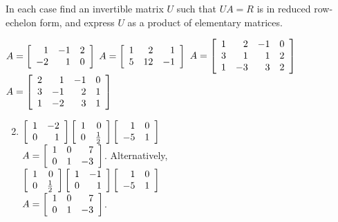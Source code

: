 \begin{multicols}{2}
\begin{ex}
In each case find an invertible matrix $U$ such that $UA = R$ is in reduced row-echelon form, and express $U$ as a product of elementary matrices.
\begin{exenumerate}
\exitem $A = \left[ \begin{array}{rrr}
1 & -1 & 2 \\
-2 & 1 & 0
\end{array} \right]$
\exitem $A = \left[ \begin{array}{rrr}
1 & 2 & 1 \\
5 & 12 & -1
\end{array} \right]$
\exitem* $A = \left[ \begin{array}{rrrr}
1 & 2 & -1 & 0 \\
3 & 1 & 1 & 2 \\
1 & -3 & 3 & 2
\end{array} \right]$
\exitem* $A = \left[ \begin{array}{rrrr}
2 & 1 & -1 & 0 \\
3 & -1 & 2 & 1 \\
1 & -2 & 3 & 1
\end{array} \right]$
\end{exenumerate}
\begin{sol}
\begin{enumerate}[label={\alph*.}]
\setcounter{enumi}{1}
\item $\left[ \begin{array}{rr}
1 & -2 \\
0 & 1
\end{array} \right] \left[ \begin{array}{rr}
1 & 0 \\
0 & \tfrac{1}{2}
\end{array} \right] \left[ \begin{array}{rr}
1 & 0 \\
-5 & 1
\end{array} \right]$ \\ $A = \left[ \begin{array}{rrr}
1 & 0 & 7 \\
0 & 1 & -3
\end{array} \right]$. Alternatively, \\ $\left[ \begin{array}{rr}
1 & 0 \\
0 & \tfrac{1}{2}
\end{array} \right] \left[ \begin{array}{rr}
1 & -1 \\
0 & 1
\end{array} \right] \left[ \begin{array}{rr}
1 & 0 \\
-5 & 1
\end{array} \right]$ \\ $A = \left[ \begin{array}{rrr}
1 & 0 & 7 \\
0 & 1 & -3
\end{array} \right]$.


\end{enumerate}
\end{sol}
\end{ex}
\end{multicols}
